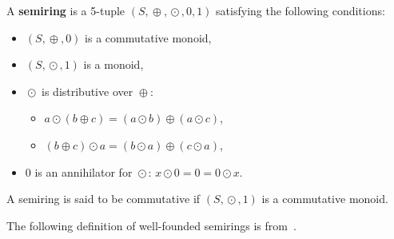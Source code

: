 \begin{definition} 
    \label{def_semiring}
        A \textbf{semiring} is a 5-tuple $(S,\mathop{\oplus},\mathop{\odot},0,1)$ satisfying the following conditions:
         \begin{itemize}
            \item {$(S,\mathop{\oplus},0)$ is a commutative monoid},
            \item {$(S,\mathop{\odot},1)$ is a monoid},
            \item {$\mathop{\odot}$ is distributive over $\mathop{\oplus}$:}
            \begin{itemize}
                \item $a \mathop{\odot} ( b \mathop{\oplus} c) \mathop{=} (a \mathop{\odot} b) \mathop{\oplus} (a \mathop{\odot} c)$, 
                \item $(b \mathop{\oplus} c) \mathop{\odot} a \mathop{=} (b \mathop{\odot} a) \mathop{\oplus} (c \mathop{\odot} a)$,
            \end{itemize} 
            \item {0 is an annihilator for $\mathop{\odot}$:} $x \mathop{\odot} 0= 0 \mathop{=}  0 \mathop{\odot} x $.
        \end{itemize}
        A semiring is said to be commutative if $(S,\mathop{\odot},1)$ is a commutative monoid.
\end{definition}
The following definition of well-founded semirings is from~\cite{endrullis2024generalized_icgt}.
